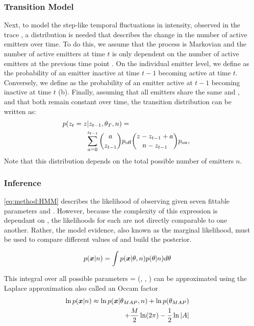 \subsubsection{Transition Model}
Next, to model the step-like temporal fluctuations in intensity, observed in the trace \trace, 
  a distribution is needed that describes the change in the number of active emitters \z{} over time. 
  To do this, we assume that the process is Markovian and the number of active emitters  
  at time $t$ is only dependent on the number of active emitters at the previous time point .
  On the individual emitter level, we define \pon as the probability of an emitter inactive at time $t-1$ becoming active at time $t$. 
  Conversely,  we define \poff as the probability of an emitter active at $t-1$ becoming inactive at time $t$ (b).
  Finally, assuming that all emitters share the same \pon and \poff, and that both remain constant over time, 
  the transition distribution can be written as:
  \begin{align}
    \label{eq:method:transition}
    p(z_{t} = z | z_{t-1}, \theta_{T}, n) &=\\
    \sum_{a = 0}^{z_{t-1}}
      {a \choose z_{t-1}}
      &\poff
      {z - z_{t-1} + a \choose \n - z_{t-1}}
      \pon
      \text{,} \notag\
  \end{align}
  Note that this distribution depends on the total possible number of emitters $n$.

\subsubsection{Inference}

\eqref{eq:method:HMM} describes the likelihood of observing \trace given seven fittable parameters and \n.
  However, because the complexity of this expression is dependant on \n, the likelihoods for each \n are not directly comparable to one another.
  Rather, the model evidence, also known as the marginal likelihood, must be used to compare different values of \n and build the posterior. 

  \begin{equation*}
    p(\bm{x} | n) = \int p(\bm{x} | \theta, n) p(\theta | n) d\theta
  \end{equation*}

  This integral over all possible parameters \parameters = (\parametersc, \parameterse, \parameterst) can be approximated using the 
  Laplace approximation also called an Occam factor \cite{bishop_pattern_2006}
  \begin{equation}
    \begin{aligned}
      \ln p(\bm{x} | n) \approx \ln p(\bm{x} | \theta_{MAP}, n) + \ln p(\theta_{MAP}) \\
      + \frac{M}{2} \ln(2\pi) - \frac{1}{2} \ln |A|
      \label{eq:method:evidence_with_m}
    \end{aligned}
  \end{equation}

